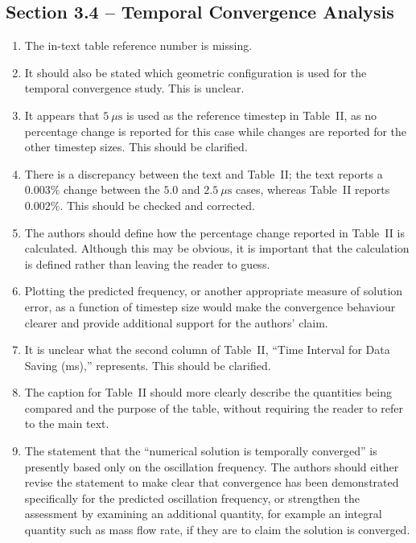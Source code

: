 \documentclass[11pt]{article}
\begin{document}
	
	\subsection*{Section 3.4 -- Temporal Convergence Analysis}
	
	\begin{enumerate}
		\item The in-text table reference number is missing.
		
		\item It should also be stated which geometric configuration is used for the temporal convergence study. This is unclear.
		
		\item It appears that $5~\mu\mathrm{s}$ is used as the reference timestep in Table~II, as no percentage change is reported for this case while changes are reported for the other timestep sizes. This should be clarified.
		
		\item There is a discrepancy between the text and Table~II; the text reports a $0.003\%$ change between the $5.0$ and $2.5~\mu\mathrm{s}$ cases, whereas Table~II reports $0.002\%$. This should be checked and corrected.
		
		\item The authors should define how the percentage change reported in Table~II is calculated. Although this may be obvious, it is important that the calculation is defined rather than leaving the reader to guess.
		
		\item Plotting the predicted frequency, or another appropriate measure of solution error, as a function of timestep size would make the convergence behaviour clearer and provide additional support for the authors' claim.
		
		\item It is unclear what the second column of Table~II, ``Time Interval for Data Saving (ms),'' represents. This should be clarified.
		
		\item The caption for Table~II should more clearly describe the quantities being compared and the purpose of the table, without requiring the reader to refer to the main text.
		
		\item The statement that the ``numerical solution is temporally converged'' is presently based only on the oscillation frequency. The authors should either revise the statement to make clear that convergence has been demonstrated specifically for the predicted oscillation frequency, or strengthen the assessment by examining an additional quantity, for example an integral quantity such as mass flow rate, if they are to claim the solution is converged.
	\end{enumerate}
	
\end{document}
